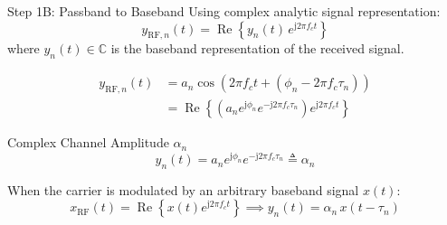 \documentclass[10pt,aspectratio=169]{beamer}
\newcommand{\jj}{\mathrm{j}}
\begin{document}
\begin{frame}{Step 1B: Passband to Baseband}
  Using complex analytic signal representation:
  \begin{equation}
    y_{\mathrm{RF}, n}(t) = \operatorname{Re}\left\{ y_n(t) \, e^{\jj 2\pi f_c t} \right\}
  \end{equation}
  where $y_n(t) \in \mathbb{C}$ is the baseband representation of the received signal.

  \begin{align}
    y_{\mathrm{RF}, n}(t) &= a_n \cos\left( 2\pi f_c t + (\phi_n - 2\pi f_c \tau_n) \right) \nonumber \\
                          &= \operatorname{Re}\left\{ \left( a_n e^{\jj\phi_n} e^{-\jj 2\pi f_c \tau_n} \right) e^{\jj 2\pi f_c t} \right\}
  \end{align}

  \begin{block}{Complex Channel Amplitude $\alpha_n$}
    \begin{equation}
      \boxed{y_n(t) = a_n e^{\jj\phi_n} e^{-\jj 2\pi f_c \tau_n} \triangleq \alpha_n}
    \end{equation}
  \end{block}
  When the carrier is modulated by an arbitrary baseband signal $x(t)$:
  \begin{equation}
    x_{\mathrm{RF}}(t) = \operatorname{Re}\left\{ x(t) e^{\jj 2\pi f_c t} \right\} \implies \boxed{y_n(t) = \alpha_n \, x(t - \tau_n)}
  \end{equation}
\end{frame}
\end{document}
